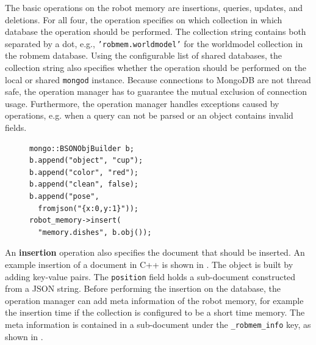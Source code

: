 The basic operations on the robot memory are insertions, queries,
updates, and deletions. For all four, the operation specifies on which
collection in which database the operation should be performed. The
collection string contains both separated by a dot,
e.g., \texttt{'robmem.worldmodel'} for the worldmodel collection in
the robmem database. Using
the configurable list of shared databases, the collection string also
specifies whether the operation should be performed on the local or
shared \texttt{mongod} instance. Because connections to MongoDB
are not thread safe, the operation manager has to guarantee the
mutual exclusion of connection usage. Furthermore, the operation
manager handles exceptions caused by operations, e.g. when a query can
not be parsed or an object contains invalid fields.

\begin{figure}
  \vspace{-0.4cm}
\begin{lstlisting}[style=SmallCpp,
  caption={Inserting a document about a red cup in C++},
  label=lst:impl-insert,
  framexleftmargin=5pt, xleftmargin=0pt,
 morekeywords={}, numbers=none]
mongo::BSONObjBuilder b;
b.append("object", "cup");
b.append("color", "red");
b.append("clean", false);
b.append("pose",
  fromjson("{x:0,y:1}"));
robot_memory->insert(
  "memory.dishes", b.obj());
\end{lstlisting}
\vspace{-8mm}
\end{figure}
An \textbf{insertion} operation also specifies the document that
should be inserted. An example insertion of a document in C++ is
shown in . The object is built by adding
key-value pairs. The \texttt{position} field holds a sub-document
constructed from a JSON string. Before performing the insertion on the database,
the operation manager can add meta information of the robot memory,
for example the insertion time if the collection is configured to be a
short time memory. The meta information is contained in a sub-document
under the \texttt{\_robmem\_info} key, as shown in
.

